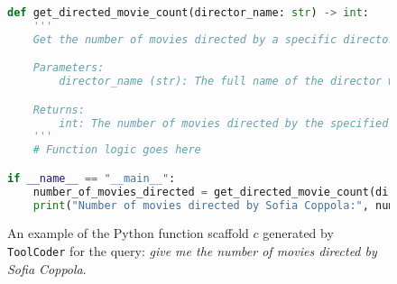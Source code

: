 \begin{figure}[t]
\centering
\begin{lstlisting}[language=python, basicstyle=\ttfamily\tiny]
def get_directed_movie_count(director_name: str) -> int:
    '''
    Get the number of movies directed by a specific director.

    Parameters:
        director_name (str): The full name of the director whose movies to count.

    Returns:
        int: The number of movies directed by the specified director.
    '''
    # Function logic goes here

if __name__ == "__main__":
    number_of_movies_directed = get_directed_movie_count(director_name="Sofia Coppola")
    print("Number of movies directed by Sofia Coppola:", number_of_movies_directed)
\end{lstlisting}
\caption{An example of the Python function scaffold $c$ generated by \texttt{ToolCoder} for the query: \textit{give me the number of movies directed by Sofia Coppola}.}
\label{fig:scaffold}
\vspace{-0.3cm}
\end{figure}